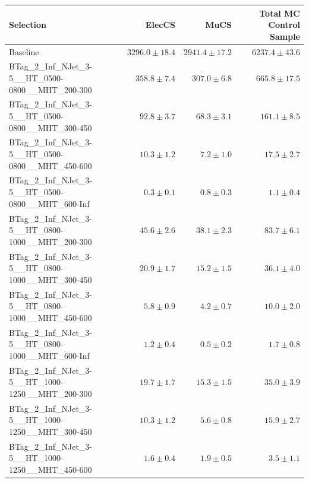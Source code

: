 \documentclass{beamer}
\begin{document}
\begin{frame}
\tiny
\begin{tabular}{lrrr}
\toprule

                                                Selection  &                   ElecCS  &                     MuCS  &          Total MC Control Sample  \\
\midrule
                                             Baseline &           $3296.0\pm18.4$&           $2941.4\pm17.2$&               $6237.4\pm43.6$ \\
 BTag\_2\_Inf\_NJet\_3-5\_\_HT\_0500-0800\_\_MHT\_200-300 &             $358.8\pm7.4$&             $307.0\pm6.8$&                $665.8\pm17.5$ \\
 BTag\_2\_Inf\_NJet\_3-5\_\_HT\_0500-0800\_\_MHT\_300-450 &              $92.8\pm3.7$&              $68.3\pm3.1$&                 $161.1\pm8.5$ \\
 BTag\_2\_Inf\_NJet\_3-5\_\_HT\_0500-0800\_\_MHT\_450-600 &              $10.3\pm1.2$&               $7.2\pm1.0$&                  $17.5\pm2.7$ \\
 BTag\_2\_Inf\_NJet\_3-5\_\_HT\_0500-0800\_\_MHT\_600-Inf &               $0.3\pm0.1$&               $0.8\pm0.3$&                   $1.1\pm0.4$ \\
 BTag\_2\_Inf\_NJet\_3-5\_\_HT\_0800-1000\_\_MHT\_200-300 &              $45.6\pm2.6$&              $38.1\pm2.3$&                  $83.7\pm6.1$ \\
 BTag\_2\_Inf\_NJet\_3-5\_\_HT\_0800-1000\_\_MHT\_300-450 &              $20.9\pm1.7$&              $15.2\pm1.5$&                  $36.1\pm4.0$ \\
 BTag\_2\_Inf\_NJet\_3-5\_\_HT\_0800-1000\_\_MHT\_450-600 &               $5.8\pm0.9$&               $4.2\pm0.7$&                  $10.0\pm2.0$ \\
 BTag\_2\_Inf\_NJet\_3-5\_\_HT\_0800-1000\_\_MHT\_600-Inf &               $1.2\pm0.4$&               $0.5\pm0.2$&                   $1.7\pm0.8$ \\
 BTag\_2\_Inf\_NJet\_3-5\_\_HT\_1000-1250\_\_MHT\_200-300 &              $19.7\pm1.7$&              $15.3\pm1.5$&                  $35.0\pm3.9$ \\
 BTag\_2\_Inf\_NJet\_3-5\_\_HT\_1000-1250\_\_MHT\_300-450 &              $10.3\pm1.2$&               $5.6\pm0.8$&                  $15.9\pm2.7$ \\
 BTag\_2\_Inf\_NJet\_3-5\_\_HT\_1000-1250\_\_MHT\_450-600 &               $1.6\pm0.4$&               $1.9\pm0.5$&                   $3.5\pm1.1$ \\

\end{tabular}
\end{frame}
\end{document}
